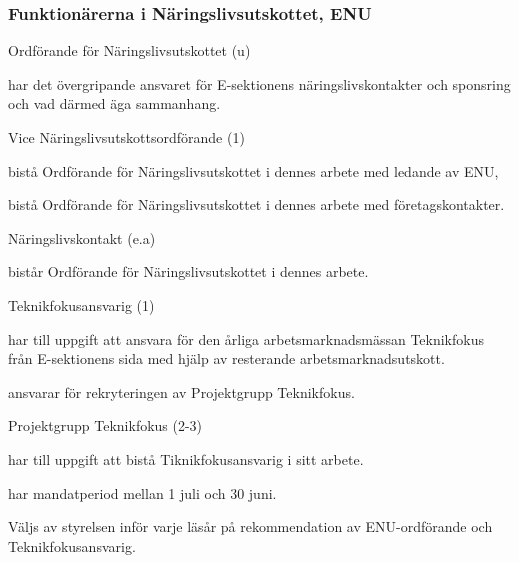 \documentclass[10pt]{article}
\begin{document}
\subsubsection{Funktionärerna i Näringslivsutskottet, ENU}

\begin{emptylist}
    \item Ordförande för Näringslivsutskottet (u)
        \begin{dashlist}
            \item har det övergripande ansvaret för E-sektionens
                näringslivskontakter och sponsring och vad därmed äga
                sammanhang.
        \end{dashlist}
    \item Vice Näringslivsutskottsordförande (1)
        \begin{dashlist}
            \item bistå Ordförande för Näringslivsutskottet i dennes arbete med ledande av ENU,
            \item bistå Ordförande för Näringslivsutskottet i dennes arbete med företagskontakter.
        \end{dashlist}
    \item Näringslivskontakt (e.a)
        \begin{dashlist}
            \item bistår Ordförande för Näringslivsutskottet i dennes arbete.
        \end{dashlist}
    \item Teknikfokusansvarig (1)
    		\begin{dashlist}
    			\item har till uppgift att ansvara för den årliga arbetsmarknadsmässan Teknikfokus från E-sektionens sida med hjälp av resterande arbetsmarknadsutskott.
    			\item ansvarar för rekryteringen av Projektgrupp Teknikfokus.
    		\end{dashlist}
    	\item Projektgrupp Teknikfokus (2-3)
    		\begin{dashlist}
    			\item har till uppgift att bistå Tiknikfokusansvarig i sitt arbete.
    			\item har mandatperiod mellan 1 juli och 30 juni.
    			\item Väljs av styrelsen inför varje läsår på rekommendation av ENU-ordförande och Teknikfokusansvarig.
    		\end{dashlist}
\end{emptylist}
\end{document}

